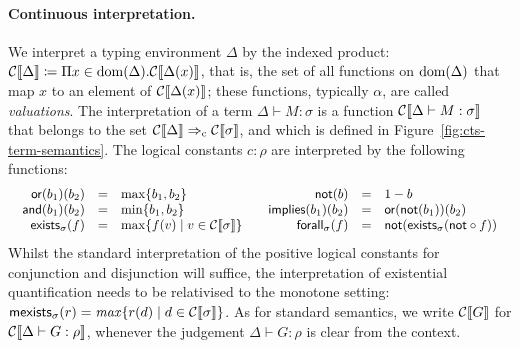 \paragraph{Continuous interpretation.}
We interpret a typing environment $\Delta$ by the indexed product:
$
  \mathcal{C}\llbracket \Delta \rrbracket \coloneqq \Pi x \in \mathrm{dom}(\Delta).\mathcal{C}\llbracket \Delta(x) \rrbracket
$,
that is, the set of all functions on $\mathrm{dom}(\Delta)$ that map $x$ to an element of $\mathcal{C}\llbracket \Delta(x) \rrbracket$;
these functions, typically $\alpha$, are called \emph{valuations}.
The interpretation of a term $\Delta \vdash M : \sigma$ is a function $\mathcal{C}\llbracket \Delta \vdash M : \sigma \rrbracket$ that belongs to the set $\mathcal{C}\llbracket \Delta \rrbracket \Rightarrow_{\rm c} \mathcal{C}\llbracket \sigma \rrbracket$, and which is defined in Figure~\ref{fig:cts-term-semantics}.
The logical constants $c : \rho$ are interpreted by the following functions:
\[
  \begin{array}{cc}
  \begin{array}{rcl}
    \mathsf{or}(b_1)(b_2) &=& \max \{b_1,b_2\} \\
    \mathsf{and}(b_1)(b_2) &=& \min \{b_1,b_2\} \\
    \mathsf{exists}_\sigma(f) &=& \max \{ f(v) \mid v \in \mathcal{C}\llbracket \sigma \rrbracket \}
  \end{array}
  &
  \begin{array}{rcl}
    \mathsf{not}(b) &=& 1 - b \\
    \mathsf{implies}(b_1)(b_2) &=& \mathsf{or}(\mathsf{not}(b_1))(b_2) \\
    \mathsf{forall}_\sigma(f) &=& \mathsf{not} (\mathsf{exists}_\sigma(\mathsf{not} \circ f))
  \end{array}
  \end{array}
\]
Whilst the standard interpretation of the positive logical constants for conjunction and disjunction will suffice, the interpretation of existential quantification needs to be relativised to the monotone setting:
$
  \mathsf{mexists}_\sigma(r) = \mathit{max} \{r(d) \mid d \in \mathcal{C}\llbracket \sigma \rrbracket\}
$.
As for standard semantics, we write $\mathcal{C}\llbracket G \rrbracket$ for $\mathcal{C}\llbracket \Delta \vdash  G : \rho \rrbracket$, whenever the judgement $\Delta \vdash  G : \rho$ is clear from the context.




